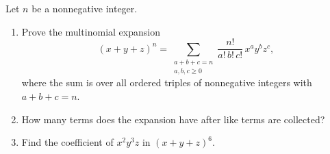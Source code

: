 Let $n$ be a nonnegative integer.
\begin{enumerate}
\item[(a)] Prove the multinomial expansion
\[(x+y+z)^n=\sum_{\substack{a+b+c=n\\ a,b,c\ge0}}\dfrac{n!}{a!\,b!\,c!}\,x^ay^bz^c,\]
where the sum is over all ordered triples of nonnegative integers with $a+b+c=n$.
\item[(b)] How many terms does the expansion have after like terms are collected?
\item[(c)] Find the coefficient of $x^2y^3z$ in $(x+y+z)^6$.
\end{enumerate}
